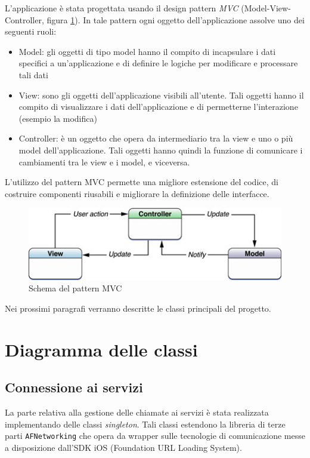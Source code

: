 L'applicazione è stata progettata usando il design pattern \emph{MVC} (Model-View-Controller, figura \ref{fig:mvc}). In tale pattern ogni oggetto dell'applicazione assolve uno dei seguenti ruoli:
\begin{itemize}
 \item Model: gli oggetti di tipo model hanno il compito di incapsulare i dati specifici a un'applicazione e di definire le logiche per modificare e processare tali dati
 \item View: sono gli oggetti dell'applicazione visibili all'utente. Tali oggetti hanno il compito di visualizzare i dati dell'applicazione e di permetterne l'interazione (esempio la modifica)
 \item Controller: è un oggetto che opera da intermediario tra la view e uno o più model dell'applicazione. Tali oggetti hanno quindi la funzione di comunicare i cambiamenti tra le view e i model, e viceversa.
\end{itemize}

L'utilizzo del pattern MVC permette una migliore estensione del codice, di costruire componenti riusabili e migliorare la definizione delle interfacce.

\begin{figure}[!htbp]
\centering
\includegraphics[scale=0.70]{architettura/mvc.png}
\caption{Schema del pattern MVC}
\label{fig:mvc}
\end{figure}

Nei prossimi paragrafi verranno descritte le classi principali del progetto.

\section{Diagramma delle classi}

\subsection{Connessione ai servizi}
La parte relativa alla gestione delle chiamate ai servizi è stata realizzata implementando delle classi \emph{singleton}. Tali classi estendono la libreria di terze parti \texttt{AFNetworking} che opera da wrapper sulle tecnologie di comunicazione messe a disposizione dall'SDK iOS (Foundation URL Loading System). 

